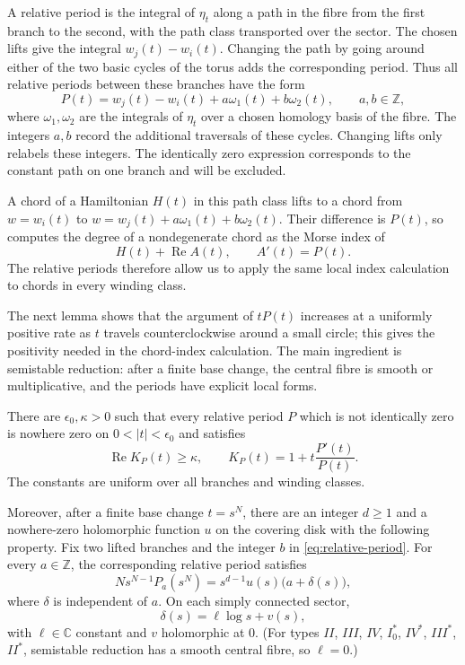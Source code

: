 \documentclass[a4paper]{amsart}
\newcommand{\ZZ}{\mathbb{Z}}
\newcommand{\C}{\mathbb{C}}
\DeclareMathOperator{\Ree}{Re}
\numberwithin{equation}{section}
\begin{document}
A relative period is the integral of $\eta_t$ along a path in the
fibre from the first branch to the second, with the path class
transported over the sector. The chosen lifts give the integral
$w_j(t)-w_i(t)$. Changing the path by going around either of the
two basic cycles of the torus adds the corresponding period. Thus
all relative periods between these branches have the form
\begin{equation}\label{eq:relative-period}
 P(t)=w_j(t)-w_i(t)+a\omega_1(t)+b\omega_2(t),
 \qquad a,b\in\ZZ,
\end{equation}
where $\omega_1,\omega_2$ are the integrals of $\eta_t$ over a chosen
homology basis of the fibre. The integers $a,b$ record the additional
traversals of these cycles. Changing lifts only relabels these integers.
The identically zero expression corresponds to the constant path on
one branch and will be excluded.

A chord of a Hamiltonian $H(t)$ in this path class lifts to a chord
from $w=w_i(t)$ to $w=w_j(t)+a\omega_1(t)+b\omega_2(t)$.
Their difference is $P(t)$, so  computes the degree
of a nondegenerate chord as the Morse index of
\[
 H(t)+\Ree A(t),\qquad A'(t)=P(t).
\]
The relative periods therefore allow us to apply the same local index
calculation to chords in every winding class.

The next lemma shows that the argument of $tP(t)$ increases at a
uniformly positive rate as $t$ travels counterclockwise around a small
circle; this gives the positivity needed in the chord-index calculation.
The main ingredient is semistable reduction: after a finite base change,
the central fibre is smooth or multiplicative, and the periods have
explicit local forms.

\begin{lemma}\label{lem:period-positivity}
There are $\epsilon_0,\kappa>0$ such that every relative period $P$
which is not identically zero is nowhere zero on $0<|t|<\epsilon_0$
and satisfies
\begin{equation}\label{eq:period-positivity}
 \Ree K_P(t)\ge\kappa,
 \qquad K_P(t)=1+t\frac{P'(t)}{P(t)}.
\end{equation}
The constants are uniform over all branches and winding classes.

Moreover, after a finite base change $t=s^N$, there are an integer
$d\geq1$ and a nowhere-zero holomorphic function $u$ on the covering
disk with the following property. Fix two lifted branches and the
integer $b$ in \eqref{eq:relative-period}. For every $a\in\ZZ$, the
corresponding relative period satisfies
\[
 Ns^{N-1}P_a(s^N)=s^{d-1}u(s)\bigl(a+\delta(s)\bigr),
\]
where $\delta$ is independent of $a$. On each simply connected sector,
\[
 \delta(s)=\ell\log s+v(s),
\]
with $\ell\in\C$ constant and $v$ holomorphic at $0$.
(For types $II$, $III$, $IV$, $I_0^*$, $IV^*$, $III^*$, $II^*$,
semistable reduction has a smooth central fibre, so $\ell=0$.)
\end{lemma}
\end{document}
